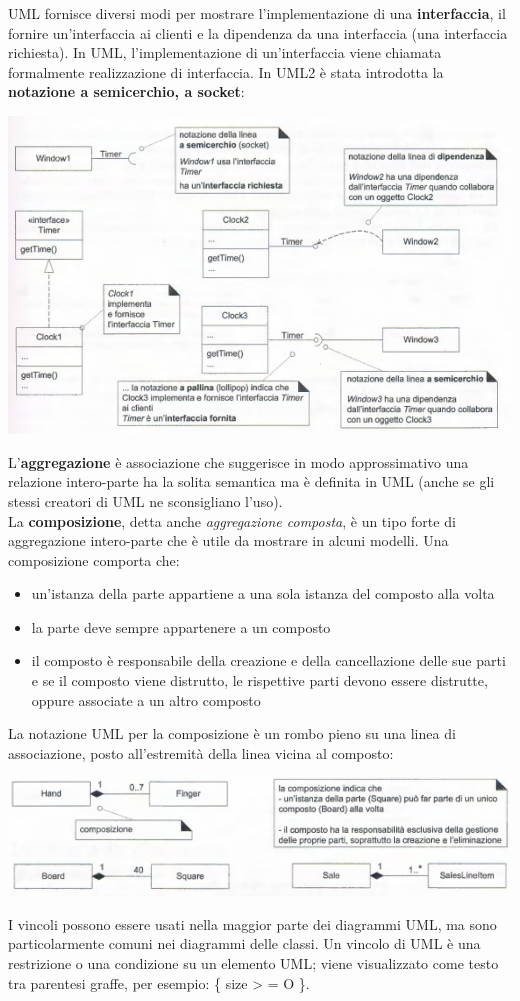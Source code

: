 \documentclass[a4paper,12pt, oneside]{book}
\begin{document}
UML fornisce diversi modi per mostrare l'implementazione di una \textbf{interfaccia}, il fornire un'interfaccia ai clienti e la dipendenza da una interfaccia (una interfaccia richiesta). In UML, l'implementazione di un'interfaccia viene chiamata formalmente realizzazione di interfaccia. In UML2 è stata introdotta la \textbf{notazione a semicerchio, a socket}:
\begin{center}
	\includegraphics[scale=0.7]{img/clasd14.png}
\end{center}
L'\textbf{aggregazione} è associazione che suggerisce in modo approssimativo una relazione intero-parte ha la solita semantica ma è definita in UML (anche se gli stessi creatori di UML ne sconsigliano l'uso).\\
La \textbf{composizione}, detta anche \textit{aggregazione composta}, è un tipo forte di aggregazione intero-parte che è utile da mostrare in alcuni modelli. Una composizione comporta che:
\begin{itemize}
	\item un'istanza della parte appartiene a una sola istanza del composto alla volta
	\item la parte deve sempre appartenere a un composto
	\item il composto è responsabile della creazione e della cancellazione delle sue parti e se il composto viene distrutto, le rispettive parti devono essere distrutte, oppure associate a un altro composto
\end{itemize}
La notazione UML per la composizione è un rombo pieno su una linea di associazione, posto all'estremità della linea vicina al composto:
\begin{center}
	\includegraphics[scale=0.7]{img/clasd15.png}
\end{center}
I vincoli possono essere usati nella maggior parte dei diagrammi UML, ma sono particolarmente comuni nei diagrammi delle classi. Un vincolo di UML è una restrizione o una
condizione su un elemento UML; viene visualizzato come testo tra parentesi graffe, per esempio: \{ size > = O \}.\\
\end{document}
